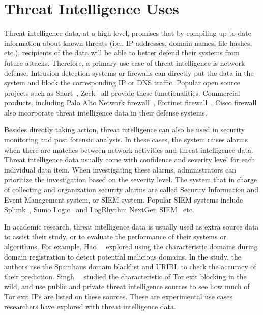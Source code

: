 \section{Threat Intelligence Uses}
\label{sec:threat_intel_uses}

Threat intelligence data, at a high-level, promises that by compiling up-to-date 
information about known threats (i.e., IP addresses, domain names, file hashes, 
etc.), recipients of the data will be able to better defend their systems from 
future attacks. Therefore, a primary use case of threat intelligence is 
network defense. Intrusion detection systems or firewalls can directly put 
the data in the system and block the corresponding IP or DNS traffic. Popular 
open source projects such as Snort~\cite{snortids}, Zeek~\cite{zeekids} all provide 
these functionalities. Commercial products, including Palo Alto Network
firewall~\cite{paloaltofirewall}, Fortinet firewall~\cite{fortinetfirewall}, 
Cisco firewall~\cite{ciscofirewall} also incorporate threat intelligence data in 
their defense systems. 

Besides directly taking action, threat intelligence can also be used in security
monitoring and post forensic analysis. In these cases, the system raises alarms
when there are matches between network activities and threat intelligence data.
Threat intelligence data usually come with confidence and severity level for each
individual data item. When investigating these alarms, administrators can 
prioritize the investigation based on the severity level. The system that in 
charge of collecting and organization security alarms are called Security 
Information and Event Management system, or SIEM system. Popular SIEM systems
include Splunk~\cite{splunk}, Sumo Logic~\cite{sumologic} and LogRhythm NextGen 
SIEM~\cite{logrhythm} etc.

In academic research, threat intelligence data is usually used as extra source 
data to assist their study, or to evaluate the performance of their systems or
algorithms. For example, Hao~\etal~\cite{hao2016predator} explored using the
characteristic domains during domain registration to detect potential malicious
domains. In the study, the authors use the Spamhaus domain blacklist and URIBL to check 
the accuracy of their prediction. Singh~\etal~\cite{singh2017characterizing} 
studied the characteristic of Tor exit blocking in the wild, and use public and
private threat intelligence sources to see how much of Tor exit IPs are listed
on these sources. These are experimental use cases researchers have explored 
with threat intelligence data. 

